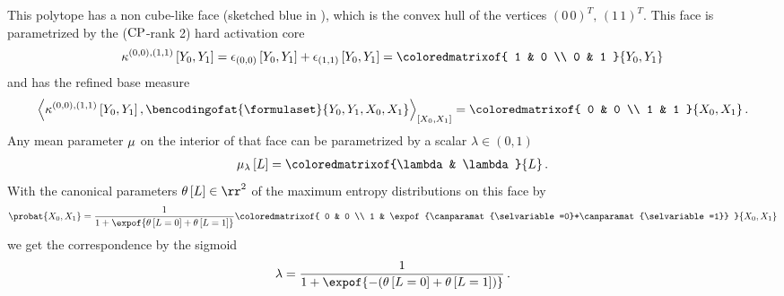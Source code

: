 \begin{example}
    This polytope has a non cube-like face (sketched blue in ), which is the convex hull of the vertices $(0 \, 0)^T, \, (1 \, 1)^T$.
    This face is parametrized by the ($\mathrm{CP}$-rank 2) hard activation core
    \begin{align*}
        \kcoreofat{(0,0),(1,1)}{\headvariableof{0},\headvariableof{1}} =
        \onehotmapofat{(0,0)}{\headvariableof{0},\headvariableof{1}}
        + \onehotmapofat{(1,1)}{\headvariableof{0},\headvariableof{1}} =
        \coloredmatrixof{
            1 & 0 \\
            0 & 1
        }{\headvariableof{0},\headvariableof{1}}
    \end{align*}
    and has the refined base measure
    \begin{align*}
        \contractionof{\kcoreofat{(0,0),(1,1)}{\headvariableof{0},\headvariableof{1}}
            ,\bencodingofat{\formulaset}{\headvariableof{0},\headvariableof{1},\catvariableof{0},\catvariableof{1}}}{\catvariableof{0},\catvariableof{1}}
        =  \coloredmatrixof{
            0 & 0 \\
            1 & 1
        }{\catvariableof{0},\catvariableof{1}}  \, .
    \end{align*}
    Any mean parameter $\mu$ on the interior of that face can be parametrized by a scalar $\lambda\in(0,1)$
    \begin{align*}
        \meanparamofat{\lambda}{\selvariable} =
        \coloredmatrixof{\lambda & \lambda}{\selvariable} \, .
    \end{align*}
    With the canonical parameters $\canparamat{\selvariable}\in\rr^2$ of the maximum entropy distributions on this face by
    \begin{align*}
        \probat{\catvariableof{0},\catvariableof{1}} =
        \frac{1}{1+\expof{\canparamat{\selvariable=0}+\canparamat{\selvariable=1}}}
        \coloredmatrixof{
            0 & 0                                                               \\
            1 & \expof{\canparamat{\selvariable=0}+\canparamat{\selvariable=1}}
        }{\catvariableof{0},\catvariableof{1}}
    \end{align*}
    we get the correspondence by the sigmoid
    \begin{align*}
        \lambda = \frac{1}{1+\expof{-(\canparamat{\selvariable=0}+\canparamat{\selvariable=1})}} \, .
    \end{align*}


\end{example}
